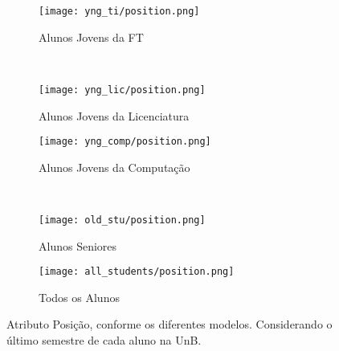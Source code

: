 \clearpage
\begin{figure}[!ht]
    \centering
    \begin{subfigure}[b]{0.48\textwidth}
        \centering
        \texttt{[image: yng\_ti/position.png]}
        \caption{Alunos Jovens da FT}
    \end{subfigure}
    ~
    \begin{subfigure}[b]{0.48\textwidth}
        \centering
        \texttt{[image: yng\_lic/position.png]}
        \caption{Alunos Jovens da Licenciatura}
    \end{subfigure}

    \begin{subfigure}[b]{0.48\textwidth}
        \centering
        \texttt{[image: yng\_comp/position.png]}
        \caption{Alunos Jovens da Computação}
    \end{subfigure}
    ~
    \begin{subfigure}[b]{0.48\textwidth}
        \centering
        \texttt{[image: old\_stu/position.png]}
        \caption{Alunos Seniores}
    \end{subfigure}

    \begin{subfigure}[b]{0.48\textwidth}
        \centering
        \texttt{[image: all\_students/position.png]}
        \caption{Todos os Alunos}
    \end{subfigure}
    \caption{Atributo Posição, conforme os diferentes modelos. Considerando o último
    semestre de cada aluno na UnB.}
\end{figure}

